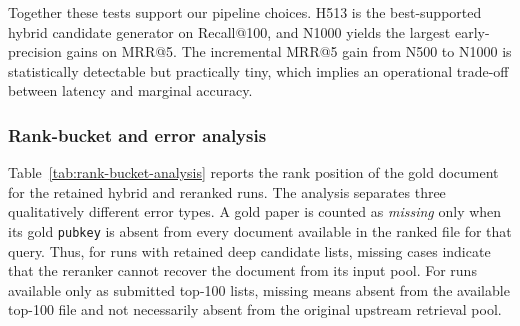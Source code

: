 \begin{table}[htbp]
    \centering
    \footnotesize
    \caption{Holm-corrected pairwise tests aligned with the pipeline objective. For retrieval-stage comparisons, $\Delta$ is the preferred hybrid minus the comparator on Recall@100. For reranking-stage comparisons, $\Delta$ is N1000 minus the comparator on MRR@5.}
    \label{tab:stage-specific-tests}
\end{table}

Together these tests support our pipeline choices. H513 is the best-supported hybrid candidate generator on Recall@100, and N1000 yields the largest early-precision gains on MRR@5. The incremental MRR@5 gain from N500 to N1000 is statistically detectable but practically tiny, which implies an operational trade-off between latency and marginal accuracy.

\subsubsection{Rank-bucket and error analysis}

Table~\ref{tab:rank-bucket-analysis} reports the rank position of the gold document for the retained hybrid and reranked runs. The analysis separates three qualitatively different error types. A gold paper is counted as \textit{missing} only when its gold \texttt{pubkey} is absent from every document available in the ranked file for that query. Thus, for runs with retained deep candidate lists, missing cases indicate that the reranker cannot recover the document from its input pool. For runs available only as submitted top-100 lists, missing means absent from the available top-100 file and not necessarily absent from the original upstream retrieval pool.

